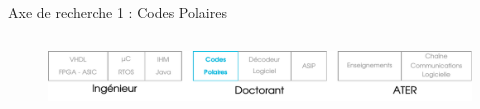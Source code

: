 \documentclass[t,compress,mathserif,12pt,xcolor=dvipsnames]{beamer}
\begin{document}
\begin{frame}[t]{Axe de recherche 1 : Codes Polaires}
\begin{minipage}[t][5.0cm][t]{\textwidth}
\begin{columns}[T]
\begin{column}{0.04\textwidth}
      \end{column}
      \begin{column}{0.33\textwidth}
      \end{column}
    \end{columns}
  \end{minipage}
  \begin{figure}[htp]
    \centering
    \includegraphics[width=\textwidth]{fig/frise20}
  \end{figure}
\end{frame}
\end{document}
